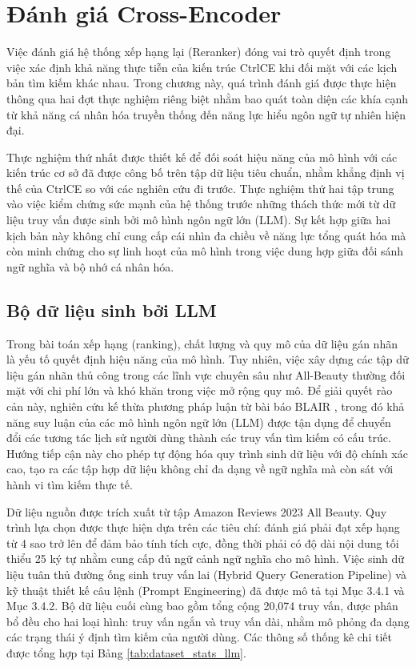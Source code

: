 \section{Đánh giá Cross-Encoder}

Việc đánh giá hệ thống xếp hạng lại (Reranker) đóng vai trò quyết định trong việc xác định khả năng thực tiễn của kiến trúc CtrlCE khi đối mặt với các kịch bản tìm kiếm khác nhau. Trong chương này, quá trình đánh giá được thực hiện thông qua hai đợt thực nghiệm riêng biệt nhằm bao quát toàn diện các khía cạnh từ khả năng cá nhân hóa truyền thống đến năng lực hiểu ngôn ngữ tự nhiên hiện đại. 

Thực nghiệm thứ nhất được thiết kế để đối soát hiệu năng của mô hình với các kiến trúc cơ sở đã được công bố trên tập dữ liệu tiêu chuẩn, nhằm khẳng định vị thế của CtrlCE so với các nghiên cứu đi trước. Thực nghiệm thứ hai tập trung vào việc kiểm chứng sức mạnh của hệ thống trước những thách thức mới từ dữ liệu truy vấn được sinh bởi mô hình ngôn ngữ lớn (LLM). Sự kết hợp giữa hai kịch bản này không chỉ cung cấp cái nhìn đa chiều về năng lực tổng quát hóa mà còn minh chứng cho sự linh hoạt của mô hình trong việc dung hợp giữa đối sánh ngữ nghĩa và bộ nhớ cá nhân hóa.

\subsection{Bộ dữ liệu sinh bởi LLM}

Trong bài toán xếp hạng (ranking), chất lượng và quy mô của dữ liệu gán nhãn là yếu tố quyết định hiệu năng của mô hình. Tuy nhiên, việc xây dựng các tập dữ liệu gán nhãn thủ công trong các lĩnh vực chuyên sâu như All-Beauty thường đối mặt với chi phí lớn và khó khăn trong việc mở rộng quy mô. Để giải quyết rào cản này, nghiên cứu kế thừa phương pháp luận từ bài báo BLAIR \cite{blair2024}, trong đó khả năng suy luận của các mô hình ngôn ngữ lớn (LLM) được tận dụng để chuyển đổi các tương tác lịch sử người dùng thành các truy vấn tìm kiếm có cấu trúc. Hướng tiếp cận này cho phép tự động hóa quy trình sinh dữ liệu với độ chính xác cao, tạo ra các tập hợp dữ liệu không chỉ đa dạng về ngữ nghĩa mà còn sát với hành vi tìm kiếm thực tế.

Dữ liệu nguồn được trích xuất từ tập Amazon Reviews 2023 All Beauty. Quy trình lựa chọn được thực hiện dựa trên các tiêu chí: đánh giá phải đạt xếp hạng từ 4 sao trở lên để đảm bảo tính tích cực, đồng thời phải có độ dài nội dung tối thiểu 25 ký tự nhằm cung cấp đủ ngữ cảnh ngữ nghĩa cho mô hình. Việc sinh dữ liệu tuân thủ đường ống sinh truy vấn lai (Hybrid Query Generation Pipeline) và kỹ thuật thiết kế câu lệnh (Prompt Engineering) đã được mô tả tại Mục 3.4.1 và Mục 3.4.2. Bộ dữ liệu cuối cùng bao gồm tổng cộng 20,074 truy vấn, được phân bổ đều cho hai loại hình: truy vấn ngắn và truy vấn dài, nhằm mô phỏng đa dạng các trạng thái ý định tìm kiếm của người dùng. Các thông số thống kê chi tiết được tổng hợp tại Bảng \ref{tab:dataset_stats_llm}.

